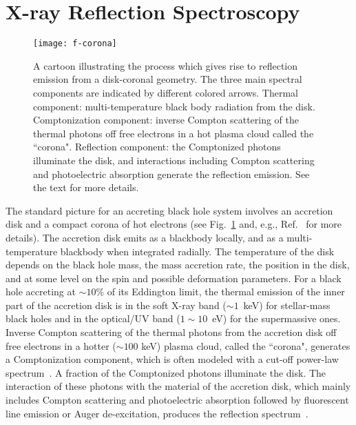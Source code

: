 \documentclass[11pt,a4paper,pdftex]{article}
\begin{document}



\section{X-ray Reflection Spectroscopy}\label{reflection}

\begin{figure}[t]
\begin{center}
\texttt{[image: f-corona]}
\end{center}
\caption{A cartoon illustrating the process which gives rise to reflection emission from a disk-coronal geometry. The three main spectral components are indicated by different colored arrows. Thermal component: multi-temperature black body radiation from the disk. Comptonization component: inverse Compton scattering of the thermal photons off free electrons in a hot plasma cloud called the ``corona". Reflection component: the Comptonized photons illuminate the disk, and interactions including Compton scattering and photoelectric absorption generate the reflection emission. See the text for more details. \label{fig:corona-disk}}
\end{figure}


The standard picture for an accreting black hole system involves an accretion disk and a compact corona of hot electrons (see Fig.~\ref{fig:corona-disk} and, e.g., Ref.~\cite{annphi} for more details). The accretion disk emits as a blackbody locally, and as a multi-temperature blackbody when integrated radially. The temperature of the disk depends on the black hole mass, the mass accretion rate, the position in the disk, and at some level on the spin and possible deformation parameters. For a black hole accreting at $\sim 10$\% of its Eddington limit, the thermal emission of the inner part of the accretion disk is in the soft X-ray band ($\sim1$~keV) for stellar-mass black holes and in the optical/UV band ($1 \sim 10$~eV) for the supermassive ones. Inverse Compton scattering of the thermal photons from the accretion disk off free electrons in a hotter ($\sim100$ keV) plasma cloud, called the ``corona", generates a Comptonization component, which is often modeled with a cut-off power-law spectrum~\cite{Sunyaev:1979nz}. A fraction of the Comptonized photons illuminate the disk. The interaction of these photons with the material of the accretion disk, which mainly includes Compton scattering and photoelectric absorption followed by fluorescent line emission or Auger de-excitation, produces the reflection spectrum~\cite{George:1991jj,Ross:2005dm}.
\end{document}
